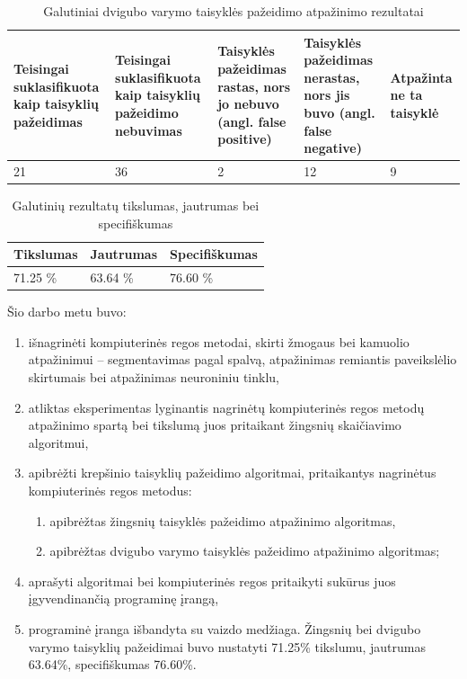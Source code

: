 \documentclass{VUMIFPSbakalaurinis}
\begin{document}
\begin{table}[H]\footnotesize
	\centering
	\caption{Galutiniai dvigubo varymo taisyklės pažeidimo atpažinimo rezultatai}
	{\begin{tabular}{|p{3cm}|p{3cm}|p{3cm}|p{3cm}|p{2cm}|} \hline
			\textbf{Teisingai suklasifikuota kaip taisyklių pažeidimas} & \textbf{Teisingai suklasifikuota kaip taisyklių pažeidimo nebuvimas} & \textbf{Taisyklės pažeidimas rastas, nors jo nebuvo (angl. false positive)} & \textbf{Taisyklės pažeidimas nerastas, nors jis buvo (angl. false negative)} & \textbf{Atpažinta ne ta taisyklė} \\
			\hline
			21  & 36    & 2    & 12  &  9 \\
			\hline
	\end{tabular}}
	\label{tab:final_results}
\end{table}

\begin{table}[H]\footnotesize
	\centering
	\caption{Galutinių rezultatų tikslumas, jautrumas bei specifiškumas}
	{\begin{tabular}{|p{5cm}|p{5cm}|p{5cm}|} \hline
			\textbf{Tikslumas} & \textbf{Jautrumas} & \textbf{Specifiškumas} \\
			\hline
			71.25 \%  & 63.64 \%    & 76.60 \%    \\
			\hline
	\end{tabular}}
	\label{tab:final_results_percents}
\end{table}


Šio darbo metu buvo:

\begin{enumerate}
	\item išnagrinėti kompiuterinės regos metodai, skirti žmogaus bei kamuolio atpažinimui – segmentavimas pagal spalvą, atpažinimas remiantis paveikslėlio skirtumais bei atpažinimas neuroniniu tinklu,
	\item atliktas eksperimentas lyginantis nagrinėtų kompiuterinės regos metodų atpažinimo spartą bei tikslumą juos pritaikant žingsnių skaičiavimo algoritmui, 
	\item apibrėžti krepšinio taisyklių pažeidimo algoritmai, pritaikantys nagrinėtus kompiuterinės regos metodus:
	\begin{enumerate}
		\item apibrėžtas žingsnių taisyklės pažeidimo atpažinimo algoritmas,
		\item apibrėžtas dvigubo varymo taisyklės pažeidimo atpažinimo algoritmas;
	\end{enumerate}
	\item aprašyti algoritmai bei kompiuterinės regos pritaikyti sukūrus juos įgyvendinančią programinę įrangą,
	\item programinė įranga išbandyta su vaizdo medžiaga. Žingsnių bei dvigubo varymo taisyklių pažeidimai buvo nustatyti 71.25\% tikslumu, jautrumas 63.64\%, specifiškumas 76.60\%.
\end{enumerate}
\end{document}
